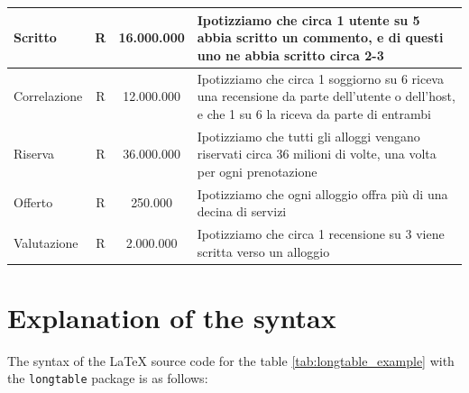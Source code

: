 \begin{longtable}{|l|c|c|p{6.2cm}|}
    \hline
    Scritto & R & 16.000.000 & Ipotizziamo che circa 1 utente su 5 abbia scritto un commento, e di questi uno ne abbia scritto circa 2-3 \\
    \hline
    Correlazione & R & 12.000.000 & Ipotizziamo che circa 1 soggiorno su 6 riceva una recensione da parte dell'utente o dell'host, e che 1 su 6 la riceva da parte di entrambi \\
    \hline
    Riserva & R & 36.000.000 & Ipotizziamo che tutti gli alloggi vengano riservati circa 36 milioni di volte, una volta per ogni prenotazione \\
    \hline
    Offerto & R & 250.000 & Ipotizziamo che ogni alloggio offra più di una decina di servizi \\
    \hline
    Valutazione & R & 2.000.000 & Ipotizziamo che circa 1 recensione su 3 viene scritta verso un alloggio
\end{longtable}

\section{Explanation of the syntax}

The syntax of the \LaTeX{} source code for the table \ref{tab:longtable_example} with the \lstinline[language=TeX]|longtable| package is as follows:

